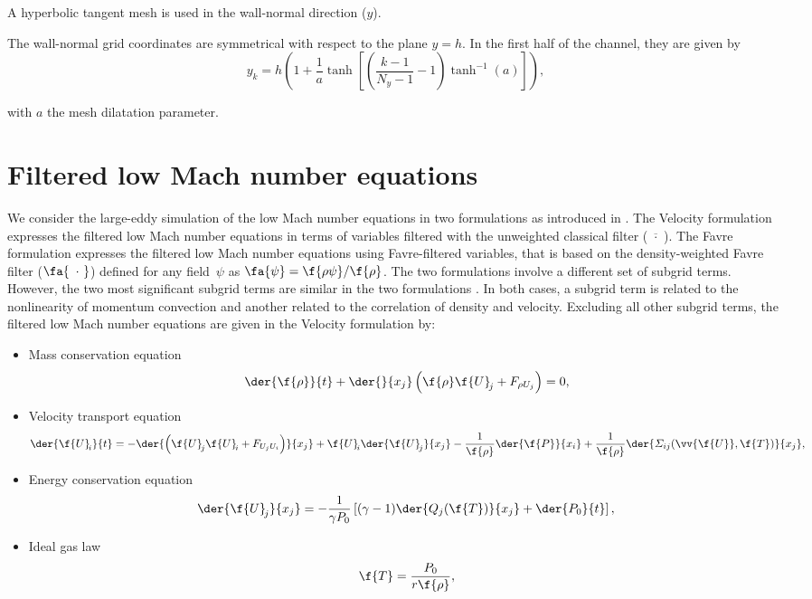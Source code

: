 A hyperbolic tangent mesh is used in the wall-normal direction ($y$).

The wall-normal grid coordinates are symmetrical with respect to the plane $y=h$. In the first half of the channel, they are given by
\begin{equation}
y_k = h \left( 1 + \frac{1}{a} \tanh\left[ \left(\frac{k-1}{N_y-1} - 1\right)\tanh^{-1}(a)\right] \right), \label{eqmesh}
\end{equation}

with $a$ the mesh dilatation parameter.

\section{Filtered low Mach number equations}\label{label-pa}

We consider the large-eddy simulation of the
low Mach number equations in two formulations as introduced in \cite{dupuy2018study}. The Velocity formulation
expresses the filtered low Mach number equations in terms of variables
filtered with the unweighted classical filter ($\overline{\,\,\cdot\,\,}$).
The Favre formulation expresses the filtered low Mach number equations using
Favre-filtered variables,
that is based on the density-weighted Favre filter ($\fa{\,\,\,\cdot\,\,}$)
defined for any field~$\psi$ as $\fa{\psi} = \f{\rho \psi} / \f{\rho}$.
The two formulations involve a different set of subgrid terms.
However, the two most significant subgrid terms are similar in the two
formulations \cite{dupuy2016, dupuy2017sft, dupuy2018study}.
In both cases, a subgrid term is related to the nonlinearity of momentum
convection and another related to the correlation of density and velocity.
Excluding all other subgrid terms, the filtered low Mach number equations are
given in the Velocity formulation by:
\begin{itemize}
\item Mass conservation equation
\begin{equation}
\der{\f{\rho}}{t} + \der{}{x_j}\left(\f{\rho} \f{U}_{\!j} + F_{\rho U_j}\right) = 0,
\end{equation}
\item Velocity transport equation
\begin{equation}
\begin{aligned}
\der{\f{U}_{\!i}}{t} = - \der{\left(\smash[t]{\f{U}_{\!j} \f{U}_{\!i} + F_{U_j U_i}}\right)}{x_j} + \f{U}_{\!i} \der{\f{U}_{\!j}}{x_j} - \frac{1}{\f{\rho}}\der{\f{P}}{x_i} + \frac{1}{\f{\rho}} \der{\varSigma_{ij}(\vv{\f{U}}, \f{T})}{x_j},
\end{aligned}
\end{equation}
\item Energy conservation equation
\begin{equation}
\der{\f{U}_{\!j}}{x_j} = - \frac{1}{\gamma P_{0}}\left[ (\gamma - 1)\der{Q_j(\f{T})}{x_j} + \der{P_{0}}{t} \right],
\end{equation}
\item Ideal gas law
\begin{equation}
\f{T} = \frac{P_{0}}{r \f{\rho}},
\end{equation}
\end{itemize}
